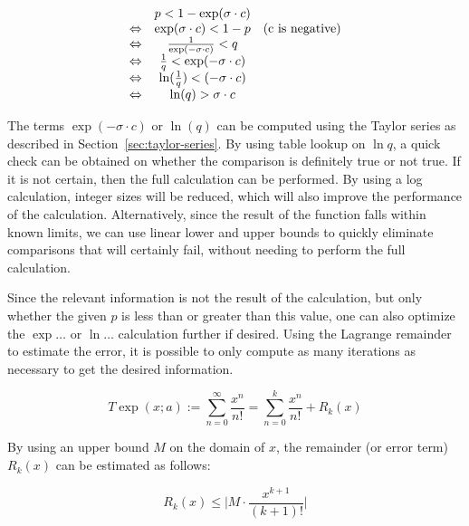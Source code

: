 \documentclass[11pt,a4paper,dvipsnames,twosided]{article}
\theoremstyle{definition}
\theoremstyle{definition}
\begin{document}
\begin{equation*}
  \begin{array}[h]{ccc}
    & p < 1 - \exp(\sigma \cdot c) & \\
    \Leftrightarrow & \exp(\sigma \cdot c) < 1 - p & (\textrm{c is negative})\\
    \Leftrightarrow & \frac{1}{\exp(-\sigma \cdot c)} < q & \\
    \Leftrightarrow & \frac{1}{q} < \exp(-\sigma \cdot c) & \\
    \Leftrightarrow & \ln(\frac{1}{q}) < (-\sigma \cdot c) & \\
    \Leftrightarrow & \ln(q) > \sigma \cdot c &
  \end{array}
\end{equation*}

\noindent
The terms $\exp(-\sigma \cdot c)$ or $\ln(q)$ can be computed using the Taylor series as
described in Section~\ref{sec:taylor-series}.   By using table lookup on $\ln{q}$, a quick
check can be obtained on whether the comparison is definitely true or not true.  If it is
not certain, then the full calculation can be performed. By using a log calculation, integer sizes will
be reduced, which will also improve the performance of the calculation.
Alternatively, since the result of the function falls within known limits, we can use linear lower and upper bounds
to quickly eliminate comparisons that will certainly fail, without needing to perform the full calculation.

Since the relevant information is not the result of the calculation, but only whether
the given $p$ is less than or greater than this value, one can also optimize the $\exp{\ldots}$ or $\ln{\ldots}$
calculation further if desired. Using the Lagrange remainder to estimate the error, it is possible to
only compute as many iterations as necessary to get the desired information.

\begin{equation*}
    T \exp(x; a) := \sum_{n=0}^{\infty}\frac{x^{n}}{n!} =
    \sum_{n=0}^k\frac{x^{n}}{n!} + R_{k}(x)
\end{equation*}

By using an upper bound $M$ on the domain of $x$, the remainder (or error
term) $R_{k}(x)$ can be estimated as follows:

\begin{equation*}
  R_{k}(x) \leq \vert M \cdot \frac{x^{k+1}}{(k+1)!}\vert
\end{equation*}
\end{document}
